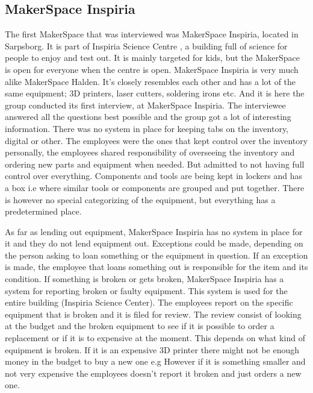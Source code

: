 \subsection{MakerSpace Inspiria}
The first MakerSpace that was interviewed was MakerSpace Inspiria, located in Sarpsborg. It is part of Inspiria Science Centre \cite{Inspiria-SC}, a building full of science for people to enjoy and test out. It is mainly targeted for kids, but the MakerSpace is open for everyone when the centre is open. MakerSpace Inspiria is very much alike MakerSpace Halden. It's closely resembles each other and has a lot of the same equipment; 3D printers, laser cutters, soldering irons etc. 
And it is here the group conducted its first interview, at MakerSpace Inspiria. The interviewee answered all the questions best possible and the group got a lot of interesting information. There was no system in place for keeping tabs on the inventory, digital or other. The employees were the ones that kept control over the inventory personally, the employees shared responsibility of overseeing the inventory and ordering new parts and equipment when needed. But admitted to not having full control over everything. Components and tools are being kept in lockers and has a box i.e where similar tools or components are grouped and put together. There is however no special categorizing of the equipment, but everything has a predetermined place. 

As far as lending out equipment, MakerSpace Inspiria has no system in place for it and they do not lend equipment out. Exceptions could be made, depending on the person asking to loan something or the equipment in question. If an exception is made, the employee that loans something out is responsible for the item and its condition. If something is broken or gets broken, MakerSpace Inspiria has a system for reporting broken or faulty equipment. This system is used for the entire building (Inspiria Science Center). The employees report on the specific equipment that is broken and it is filed for review. The review consist of looking at the budget and the broken equipment to see if it is possible to order a replacement or if it is to expensive at the moment. This depends on what kind of equipment is broken. If it is an expensive 3D printer there might not be enough money in the budget to buy a new one e.g However if it is something smaller and not very expensive the employees doesn't report it broken and just orders a new one. 

